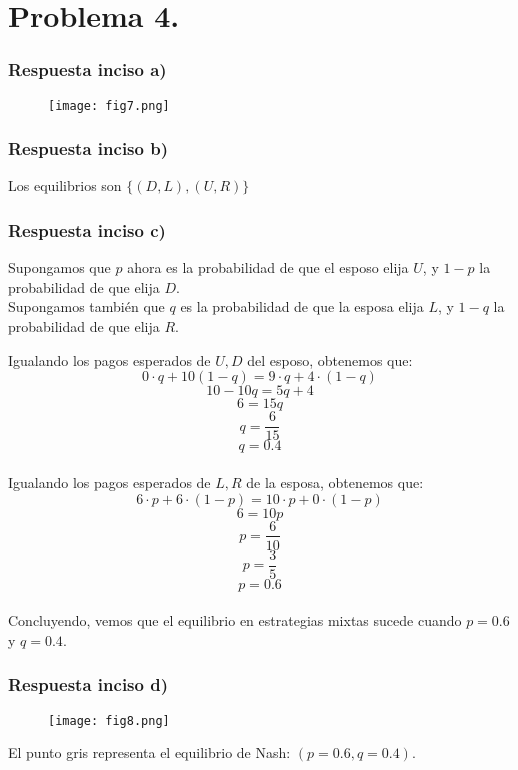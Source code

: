 \documentclass{article}
\begin{document}
            \newpage
            
    \section*{Problema 4.}
        \subsubsection*{Respuesta inciso a)}
            \begin{figure}[h]
                \centering
                \texttt{[image: fig7.png]}
            \end{figure}
                
        \subsubsection*{Respuesta inciso b)}
            Los equilibrios son $\{(D, L),(U,R)\}$

        \subsubsection*{Respuesta inciso c)}
            Supongamos que $p$ ahora es la probabilidad de que el esposo elija $U$, y $1-p$ la probabilidad de que elija $D$.
            \\
            Supongamos también que $q$ es la probabilidad de que la esposa elija $L$, y $1-q$ la probabilidad de que elija $R$.

            Igualando los pagos esperados de $U, D$ del esposo, obtenemos que:
            \[0 \cdot q + 10(1-q) = 9 \cdot q + 4 \cdot (1-q)\]
            \[10 - 10q = 5q+4\]
            \[6 = 15q\]
            \[q = \frac{6}{15}\]
            \[q = 0.4\]
            \\
            Igualando los pagos esperados de $L, R$ de la esposa, obtenemos que:
            \[6 \cdot p + 6 \cdot (1-p) = 10 \cdot p + 0 \cdot (1-p)\]
            \[6 = 10p\]
            \[p = \frac{6}{10}\]
            \[p = \frac{3}{5}\]
            \[p = 0.6\]
            \\
            Concluyendo, vemos que el equilibrio en estrategias mixtas sucede cuando $p = 0.6$ y $q = 0.4$.

        \newpage

        \subsubsection*{Respuesta inciso d)}
            \begin{figure}[h]
                \centering
                \texttt{[image: fig8.png]}
            \end{figure}

            El punto gris representa el equilibrio de Nash: $(p=0.6, q=0.4)$.
\end{document}
